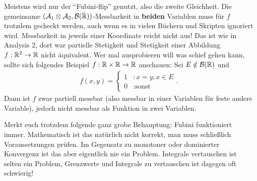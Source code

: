 	\begin{warnung}
		Meistens wird nur der \enquote{Fubini-flip} genutzt, also die zweite Gleichheit. Die gemeinsame $(\mathcal{A}_1 \otimes \mathcal{A}_2, \mathcal{B}(\bar {\mathbb{R}}))$-Messbarkeit in \textbf{beiden} Variablen muss f\"ur $f$ trotzdem gecheckt werden, auch wenn es in vielen B\"uchern und Skripten ignoriert wird. Messbarkeit in jeweils einer Koordinate reicht nicht aus! Das ist wie in Analysis 2, dort war partielle Stetigkeit und Stetigkeit einer Abbildung $f:\mathbb{R}^2\to \mathbb{R}$ nicht \"aquivalent. Wer mal ausprobieren will was schief gehen kann, sollte sich folgendes Beispiel $f:\mathbb{R}\times \mathbb{R}\to \mathbb{R}$ anschauen: Sei $E\notin \mathcal B(\mathbb{R})$ und
		\begin{align*}
			f(x,y)=
			\begin{cases}
				1&:x=y, x\in E\\
				0&:\text{sonst}
			\end{cases}.
		\end{align*}
		Dann ist $f$ zwar partiell messbar (also messbar in einer Variablen f\"ur feste andere Variable), jedoch nicht messbar als Funktion in zwei Variablen. 
	\end{warnung}
Merkt euch trotzdem folgende ganz grobe Behauptung: \glqq Fubini funktioniert immer\grqq. Mathematisch ist das nat\"urlich nicht korrekt, man muss schlie\ss lich Voraussetzungen pr\"ufen. Im Gegensatz zu monotoner oder dominierter Konvergenz ist das aber eigentlich nie ein Problem. Integrale vertauschen ist selten ein Problem, Grenzwerte und Integrale zu vertauschen ist dagegen oft schwierig!

